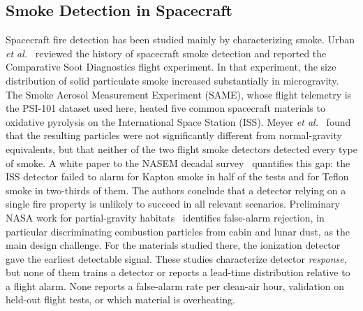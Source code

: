 \subsection{Smoke Detection in Spacecraft}
Spacecraft fire detection has been studied mainly by characterizing smoke. Urban \emph{et al.}~\cite{urban2005detection} reviewed the history of spacecraft smoke detection and reported the Comparative Soot Diagnostics flight experiment. In that experiment, the size distribution of solid particulate smoke increased substantially in microgravity. The Smoke Aerosol Measurement Experiment (SAME), whose flight telemetry is the PSI-101 dataset used here, heated five common spacecraft materials to oxidative pyrolysis on the International Space Station (ISS). Meyer \emph{et al.}~\cite{meyer2018evaluation} found that the resulting particles were not significantly different from normal-gravity equivalents, but that neither of the two flight smoke detectors detected every type of smoke. A white paper to the NASEM decadal survey~\cite{fortenberry2021research} quantifies this gap: the ISS detector failed to alarm for Kapton smoke in half of the tests and for Teflon smoke in two-thirds of them. The authors conclude that a detector relying on a single fire property is unlikely to succeed in all relevant scenarios. Preliminary NASA work for partial-gravity habitats~\cite{guzman2026early} identifies false-alarm rejection, in particular discriminating combustion particles from cabin and lunar dust, as the main design challenge. For the materials studied there, the ionization detector gave the earliest detectable signal. These studies characterize detector \emph{response}, but none of them trains a detector or reports a lead-time distribution relative to a flight alarm. None reports a false-alarm rate per clean-air hour, validation on held-out flight tests, or which material is overheating.

